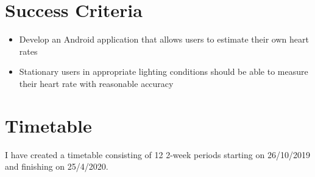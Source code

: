 \documentclass{article}
\begin{document}
\section*{Success Criteria}
\begin{itemize}
\item Develop an Android application that allows users to estimate their own heart rates
\item Stationary users in appropriate lighting conditions should be able to measure their heart rate with reasonable accuracy
\end{itemize}

\section*{Timetable}
I have created a timetable consisting of 12 2-week periods starting on 26/10/2019 and finishing on 25/4/2020.
\end{document}
